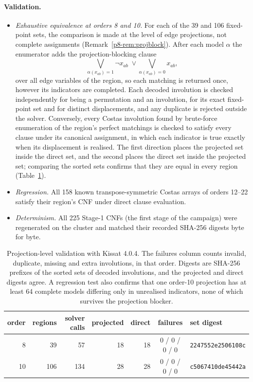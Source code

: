 \documentclass[11pt,a4paper,oneside]{report}
\theoremstyle{definition}
\begin{document}
\paragraph{Validation.}
\begin{itemize}
\item \emph{Exhaustive equivalence at orders 8 and 10.} For each of the 39 and 106 fixed-point
sets, the comparison is made at the level of edge projections, not complete assignments
(Remark~\ref{p8-rem:projblock}). After each model $\alpha$ the enumerator adds the
projection-blocking clause
\[
\bigvee_{\alpha(x_{ab})=1}\neg x_{ab}\;\vee\bigvee_{\alpha(x_{ab})=0}x_{ab},
\]
over all edge variables of the region, so each matching is returned once, however its indicators
are completed. Each decoded involution is checked independently for being a permutation and an
involution, for its exact fixed-point set and for distinct displacements, and any duplicate is
rejected outside the solver. Conversely, every Costas involution found by brute-force enumeration of
the region's perfect matchings is checked to satisfy every clause under its canonical assignment, in
which each indicator is true exactly when its displacement is realised. The first direction places
the projected set inside the direct set, and the second places the direct set inside the projected
set; comparing the sorted sets confirms that they are equal in every region
(Table~\ref{p8-tab:projval}).
\item \emph{Regression.} All 158 known transpose-symmetric Costas arrays of orders 12--22
satisfy their region's CNF under direct clause evaluation.
\item \emph{Determinism.} All 225 Stage-1 CNFs (the first stage of the campaign) were regenerated
on the cluster and matched their recorded SHA-256 digests byte for byte.
\end{itemize}

\begin{table}[H]
\centering
\small
\begin{tabular}{@{}rrrrrcl@{}}
\toprule
order & regions & solver calls & projected & direct & failures & set digest \\
\midrule
8 & 39 & 57 & 18 & 18 & 0 / 0 / 0 / 0 & \texttt{2247552e2506108c} \\
10 & 106 & 134 & 28 & 28 & 0 / 0 / 0 / 0 & \texttt{c5067410de45442a} \\
\bottomrule
\end{tabular}
\caption{Projection-level validation with Kissat 4.0.4. The failures column counts invalid,
duplicate, missing and extra involutions, in that order. Digests are SHA-256 prefixes of the sorted
sets of decoded involutions, and the projected and direct digests agree. A regression test also
confirms that one order-10 projection has at least 64 complete models differing only in unrealised
indicators, none of which survives the projection blocker.}
\label{p8-tab:projval}
\end{table}
\end{document}

